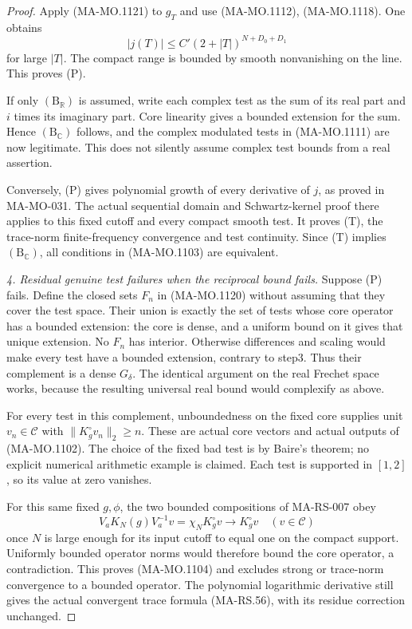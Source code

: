 \begin{proof}
Apply (MA-MO.1121) to \(g_T\) and use
(MA-MO.1112), (MA-MO.1118).  One obtains
\[
                    |j(T)|\le C'(2+|T|)^{N+D_0+D_1}
\tag{MA-MO.1122}
\]
for large \(|T|\).  The compact range is
bounded by smooth nonvanishing on the line.
This proves (P).

If only \(\mathrm{(B_{\mathbb R})}\) is
assumed, write each complex test as the
sum of its real part and \(i\) times its
imaginary part.  Core linearity gives a
bounded extension for the sum.  Hence
\(\mathrm{(B_{\mathbb C})}\) follows, and
the complex modulated tests in
(MA-MO.1111) are now legitimate.  This
does not silently assume complex test
bounds from a real assertion.

Conversely, (P) gives polynomial growth
of every derivative of \(j\), as proved
in MA-MO-031.  The actual sequential
domain and Schwartz-kernel proof there
applies to this fixed cutoff and every
compact smooth test.  It proves (T),
the trace-norm finite-frequency convergence
and test continuity.  Since (T) implies
\(\mathrm{(B_{\mathbb C})}\), all
conditions in (MA-MO.1103) are equivalent.

\emph{4. Residual genuine test failures
when the reciprocal bound fails.}
Suppose (P) fails.  Define the closed
sets \(F_n\) in (MA-MO.1120) without
assuming that they cover the test space.
Their union is exactly the set of tests
whose core operator has a bounded
extension: the core is dense, and a
uniform bound on it gives that unique
extension.  No \(F_n\) has interior.
Otherwise differences and scaling would
make every test have a bounded extension,
contrary to step3.  Thus their complement
is a dense \(G_\delta\).  The identical
argument on the real Frechet space works,
because the resulting universal real
bound would complexify as above.

For every test in this complement,
unboundedness on the fixed core supplies
unit \(v_n\in\mathscr C\) with
\(\|K^\circ_gv_n\|_2\ge n\).
These are actual core vectors and actual
outputs of (MA-MO.1102).  The choice of
the fixed bad test is by Baire's theorem;
no explicit numerical arithmetic example
is claimed.  Each test is supported in
\([1,2]\), so its value at zero vanishes.

For this same fixed \(g,\phi\), the two
bounded compositions of MA-RS-007 obey
\[
 V_aK_N(g)V_a^{-1}v
              =\chi_NK^\circ_gv
                       \longrightarrow K^\circ_gv
                       \quad(v\in\mathscr C)
\tag{MA-MO.1123}
\]
once \(N\) is large enough for its input
cutoff to equal one on the compact support.
Uniformly bounded operator norms would
therefore bound the core operator, a
contradiction.  This proves (MA-MO.1104)
and excludes strong or trace-norm
convergence to a bounded operator.
The polynomial logarithmic derivative
still gives the actual convergent trace
formula (MA-RS.56), with its residue
correction unchanged.


\end{proof}
